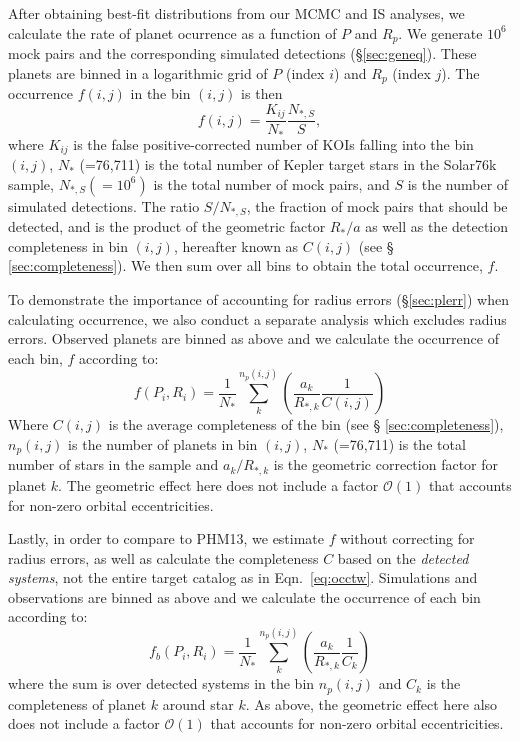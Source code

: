 After obtaining best-fit distributions from our MCMC and IS
analyses, we calculate the rate of planet ocurrence as a function
of $P$ and $R_p$. We generate $10^6$ mock pairs and the corresponding
simulated detections (\S \ref{sec:geneq}). These planets are binned in
a logarithmic grid of $P$ (index $i$) and $R_p$ (index $j$). The
occurrence $f(i,j)$ in the bin $(i,j)$ is then
\begin{equation}
f(i,j) = \frac{K_{ij}}{N_*}\frac{N_{*,S}}{S},
\label{eq:ISocc}
\end{equation}
where $K_{ij}$ is the false positive-corrected \citep[Table
1,][]{Fressin2013} number of KOIs falling into the bin $(i,j)$,
$N_{*}$ (=76,711) is the total number of Kepler target stars in
the Solar76k sample, $N_{*,S} (=10^6)$ is the total number of
mock pairs, and $S$ is the number of simulated detections.  
The ratio $S/N_{*,S}$, the fraction of mock pairs that should be detected, 
and is the product of the geometric factor $R_*/a$ as well as the detection 
completeness in bin $(i,j)$, hereafter known as $C(i,j)$ (see \S
\ref{sec:completeness}).  We then sum over all bins to obtain the total 
occurrence, $f$.

To demonstrate the importance of accounting for radius errors 
(\S\ref{sec:plerr}) when calculating occurrence, we also conduct 
a separate analysis which excludes radius errors. Observed planets are 
binned as above and we calculate the occurrence of each bin, $f$ according to:
\begin{equation}
f(P_i,R_i) = \frac{1}{N_*}\sum\limits_{k}^{n_p(i,j)}\left(\frac{a_k}{R_{*,k}}\frac{1}{C(i,j)}\right)
\label{eq:occtw}
\end{equation}
Where $C(i,j)$ is the average completeness of the bin (see \S
\ref{sec:completeness}), $n_p(i,j)$ is the number of planets in bin $(i,j)$, 
$N_*$ (=76,711) is the total number of stars in the sample and $a_k/R_{*,k}$ is 
the geometric correction factor for planet $k$. The geometric effect here 
does not include a factor $\mathcal{O}(1)$ that accounts for non-zero 
orbital eccentricities.

Lastly, in order to compare to PHM13, we estimate $f$ without
correcting for radius errors, as well as calculate the completeness
$C$ based on the {\it detected systems}, not the entire
target catalog as in Eqn.~\ref{eq:occtw}.  Simulations and
observations are binned as above and we calculate the occurrence of
each bin according to:
\begin{equation}
f_b(P_i,R_i) = \frac{1}{N_*}\sum\limits_{k}^{n_p(i,j)}\left(\frac{a_k}{R_{*,k}}\frac{1}{C_{k}}\right)
\label{eq:occ}
\end{equation}
where the sum is over detected systems in the bin $n_p(i,j)$ and $C_{k}$ is the
completeness of planet $k$ around star $k$. As above, the geometric 
effect here also does not include a factor $\mathcal{O}(1)$ that 
accounts for non-zero orbital eccentricities. 

